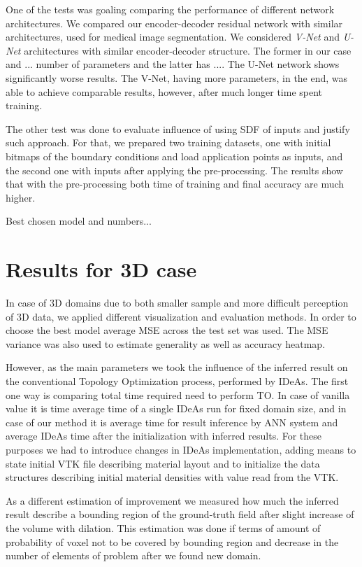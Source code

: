 One of the tests was goaling comparing the performance of different network architectures.
We compared our encoder-decoder residual network with similar architectures, used for medical image segmentation.
We considered \emph{V-Net}\cite{} and \emph{U-Net}\cite{} architectures with similar encoder-decoder structure.
The former in our case and $...$ number of parameters and the latter has $...$.
The U-Net network shows significantly worse results.
The V-Net, having more parameters, in the end, was able to achieve comparable results, however, after much longer time spent training.
\medskip

The other test was done to evaluate influence of using SDF of inputs and justify such approach.
For that, we prepared two training datasets, one with initial bitmaps of the boundary conditions and load application points as inputs, and the second one with inputs after applying the pre-processing.
The results show that with the pre-processing both time of training and final accuracy are much higher.
\medskip

Best chosen model and numbers...

\section{Results for 3D case}

In case of 3D domains due to both smaller sample and more difficult perception of 3D data, we applied different visualization and evaluation methods.
In order to choose the best model average MSE across the test set was used.
The MSE variance was also used to estimate generality as well as accuracy heatmap.

However, as the main parameters we took the influence of the inferred result on the conventional Topology Optimization process, performed by IDeAs.
The first one way is comparing total time required need to perform TO. 
In case of vanilla value it is time average time of a single IDeAs run for fixed domain size, and in case of our method it is average time for result inference by ANN system and average IDeAs time after the initialization with inferred results. For these purposes we had to introduce changes in IDeAs implementation, adding means to state initial VTK file describing material layout and to initialize the data structures describing initial material densities with value read from the VTK.

As a different estimation of improvement we measured how much the inferred result describe a bounding region of the ground-truth field after slight increase of the volume with dilation.
This estimation was done if terms of amount of probability of voxel not to be covered by bounding region and decrease in the number of elements of problem  after we found new domain. 

